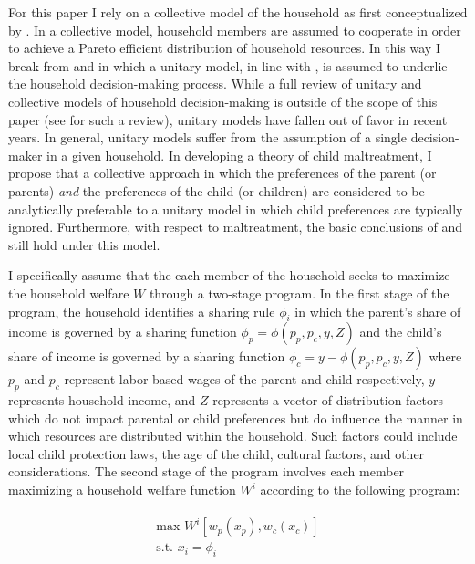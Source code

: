 \documentclass[1p, review]{elsarticle}\usepackage[]{graphicx}\usepackage[]{color}
\begin{document}
For this paper I rely on a collective model of the household as first conceptualized by \citet{Chiappori1988}. In a collective model, household members are assumed to cooperate in order to achieve a Pareto efficient distribution of household resources. In this way I break from \citet{Brandon1999} and \citet{Brandon2001} in which a unitary model, in line with \citet{Becker1981}, is assumed to underlie the household decision-making process. While a full review of unitary and collective models of household decision-making is outside of the scope of this paper (see \citet{Chiappori2011} for such a review), unitary models have fallen out of favor in recent years. In general, unitary models suffer from the assumption of a single decision-maker in a given household. In developing a theory of child maltreatment, I propose that a collective approach in which the preferences of the parent (or parents) \emph{and} the preferences of the child (or children) are considered to be analytically preferable to a unitary model in which child preferences are typically ignored. Furthermore, with respect to maltreatment, the basic conclusions of \citet{Brandon1999} and \citet{Brandon2001} still hold under this model. 

I specifically assume that the each member of the household seeks to maximize the household welfare $W$ through a two-stage program. In the first stage of the program, the household identifies a sharing rule $\phi_i$ in which the parent's share of income is governed by a sharing function $\phi_p=\phi(p_p, p_c, y, Z)$ and the child's share of income is governed by a sharing function $\phi_c=y-\phi(p_p, p_c, y, Z)$ where $p_p$ and $p_c$ represent labor-based wages of the parent and child respectively, $y$ represents household income, and $Z$ represents a vector of distribution factors which do not impact parental or child preferences but do influence the manner in which resources are distributed within the household. Such factors could include local child protection laws, the age of the child, cultural factors, and other considerations. The second stage of the program involves each member maximizing a household welfare function $W^i$ according to the following program:  

\begin{align}\label{eqn:stage2}
\begin{split}
\text{max } W^i[w_p(x_p), w_c(x_c)]\\
\text{s.t. } x_i = \phi_i
\end{split}
\end{align}
\end{document}

